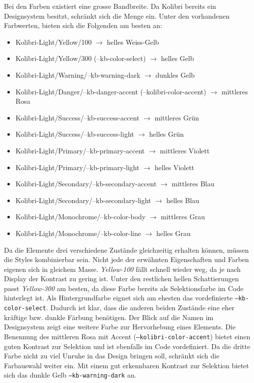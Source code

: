 Bei den Farben existiert eine grosse Bandbreite.
Da Kolibri bereits ein Designsystem besitzt, schränkt sich die Menge ein.
Unter den vorhandenen Farbwerten, bieten sich die Folgenden am besten an:

\begin{itemize}
    \item Kolibri-Light/Yellow/100 $\rightarrow$ helles Weiss-Gelb
    \item Kolibri-Light/Yellow/300 (--kb-color-select) $\rightarrow$ helles Gelb
    \item Kolibri-Light/Warning/--kb-warning-dark $\rightarrow$ dunkles Gelb
    \item Kolibri-Light/Danger/--kb-danger-accent (--kolibri-color-accent) $\rightarrow$ mittleres Rosa
    \item Kolibri-Light/Success/--kb-success-accent $\rightarrow$ mittleres Grün
    \item Kolibri-Light/Success/--kb-success-light $\rightarrow$ helles Grün
    \item Kolibri-Light/Primary/--kb-primary-accent $\rightarrow$ mittleres Violett
    \item Kolibri-Light/Primary/--kb-primary-light $\rightarrow$ helles Violett
    \item Kolibri-Light/Secondary/--kb-secondary-accent $\rightarrow$ mittleres Blau
    \item Kolibri-Light/Secondary/--kb-secondary-light $\rightarrow$ helles Blau
    \item Kolibri-Light/Monochrome/--kb-color-body $\rightarrow$ mittleres Grau
    \item Kolibri-Light/Monochrome/--kb-color-line $\rightarrow$ helles Grau
\end{itemize}

Da die Elemente drei verschiedene Zustände gleichzeitig erhalten können, müssen die Styles kombinierbar sein.
Nicht jede der erwähnten Eigenschaften und Farben eigenen sich in gleichem Masse.
\emph{Yellow-100} fällt schnell wieder weg, da je nach Display der Kontrast zu gering ist.
Unter den restlichen hellen Schattierungen passt \emph{Yellow-300} am besten, da diese Farbe bereits als Selektionsfarbe im Code hinterlegt ist.
Als Hintergrundfarbe eignet sich am ehesten das vordefinierte \texttt{--kb-color-select}. 
Dadurch ist klar, dass die anderen beiden Zustände eine eher kräftige bzw. dunkle Färbung benötigen.
Der Blick auf die Namen im Designsystem zeigt eine weitere Farbe zur Hervorhebung eines Elements.
Die Benennung des mittleren Rosa mit Accent (\texttt{--kolibri-color-accent}) bietet einen guten Kontrast zur Selektion und ist ebenfalls im Code vordefiniert.
Da die dritte Farbe nicht zu viel Unruhe in das Design bringen soll, schränkt sich die Farbauswahl weiter ein.
Mit einem gut erkennbaren Kontrast zur Selektion bietet sich das dunkle Gelb \texttt{--kb-warning-dark} an.

